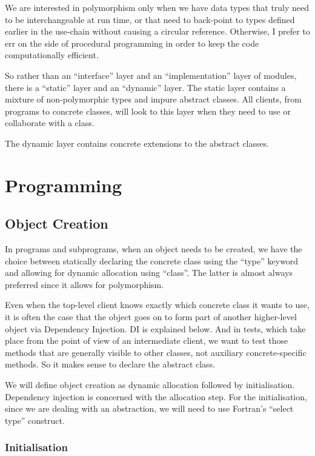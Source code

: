 \documentclass[dvips, 11pt, a4paper]{article}
\begin{document}
We are interested in polymorphism only when we have data types that
truly need to be interchangeable at run time, or that need to
back-point to types defined earlier in the use-chain without causing a
circular reference.  Otherwise, I prefer to err on the side of procedural
programming in order to keep the code computationally efficient.

So rather than an ``interface'' layer and an ``implementation'' layer
of modules, there is a ``static'' layer and an ``dynamic'' layer.  The
static layer contains a mixture of non-polymorphic types and impure
abstract classes.  All clients, from programs to concrete classes, will
look to this layer when they need to use or collaborate with a class.

The dynamic layer contains concrete extensions to the abstract classes.


\section{Programming}
\label{sec:Programming}


\subsection{Object Creation}
\label{sec:ObjectCreation}

In programs and subprograms, when an object needs to be created, we
have the choice between statically declaring the concrete class using
the ``type'' keyword and allowing for dynamic allocation using
``class''.  The latter is almost always preferred since it allows for
polymorphism.

Even when the top-level client knows exactly which concrete class it
wants to use, it is often the case that the object goes on to form
part of another higher-level object via Dependency Injection.  DI is
explained below.  And in tests, which take place from the point of
view of an intermediate client, we want to test those methods that are
generally visible to other classes, not auxiliary concrete-specific
methods.  So it makes sense to declare the abstract class.

We will define object creation as dynamic allocation followed by
initialisation.  Dependency injection is concerned with the allocation
step.  For the initialisation, since we are dealing with an abstraction,
we will need to use Fortran's ``select type'' construct.

\subsubsection{Initialisation}
\end{document}
